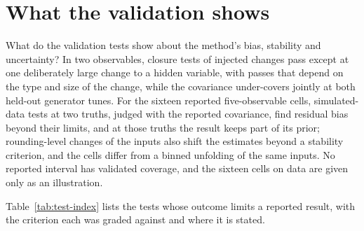 \section{What the validation shows}
\label{sec:part-q3}

What do the validation tests show about the method's bias, stability and uncertainty? In two observables, closure tests of injected changes pass except at one deliberately large change to a hidden variable, with passes that depend on the type and size of the change, while the covariance under-covers jointly at both held-out generator tunes. For the sixteen reported five-observable cells, simulated-data tests at two truths, judged with the reported covariance, find residual bias beyond their limits, and at those truths the result keeps part of its prior; rounding-level changes of the inputs also shift the estimates beyond a stability criterion, and the cells differ from a binned unfolding of the same inputs. No reported interval has validated coverage, and the sixteen cells on data are given only as an illustration.

Table~\ref{tab:test-index} lists the tests whose outcome limits a reported result, with the criterion each was graded against and where it is stated.

